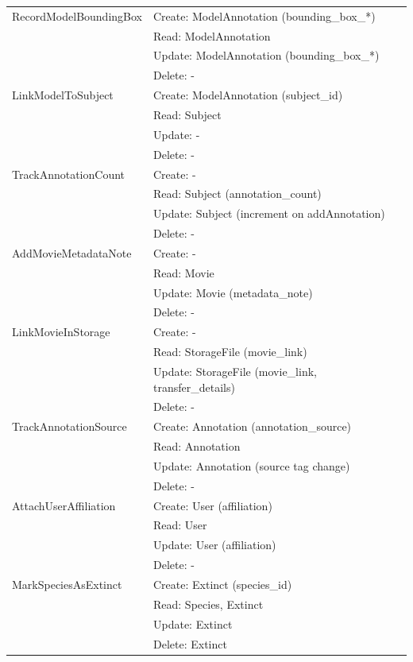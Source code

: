 \begin{longtable}{|l|l|}
RecordModelBoundingBox & Create: ModelAnnotation (bounding\_box\_*) \\
                       & Read: ModelAnnotation \\
                       & Update: ModelAnnotation (bounding\_box\_*) \\
                       & Delete: - \\
\hline
LinkModelToSubject & Create: ModelAnnotation (subject\_id) \\
                   & Read: Subject \\
                   & Update: - \\
                   & Delete: - \\
\hline
TrackAnnotationCount & Create: - \\
                     & Read: Subject (annotation\_count) \\
                     & Update: Subject (increment on addAnnotation) \\
                     & Delete: - \\
\hline
AddMovieMetadataNote & Create: - \\
                     & Read: Movie \\
                     & Update: Movie (metadata\_note) \\
                     & Delete: - \\
\hline
LinkMovieInStorage & Create: - \\
                   & Read: StorageFile (movie\_link) \\
                   & Update: StorageFile (movie\_link, transfer\_details) \\
                   & Delete: - \\
\hline
TrackAnnotationSource & Create: Annotation (annotation\_source) \\
                      & Read: Annotation \\
                      & Update: Annotation (source tag change) \\
                      & Delete: - \\
\hline
AttachUserAffiliation & Create: User (affiliation) \\
                      & Read: User \\
                      & Update: User (affiliation) \\
                      & Delete: - \\
\hline
MarkSpeciesAsExtinct & Create: Extinct (species\_id) \\
                     & Read: Species, Extinct \\
                     & Update: Extinct \\
                     & Delete: Extinct \\
\hline
\end{longtable}


